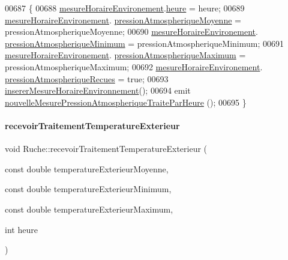 \begin{DoxyCode}
00687 \{
00688     \hyperlink{class_ruche_a73a826506110c10d9221065670985e52}{mesureHoraireEnvironement}.\hyperlink{struct_mesure_horaire_environement_a83295c95940d9edae2d082a94f49e1c9}{heure} = heure;
00689     \hyperlink{class_ruche_a73a826506110c10d9221065670985e52}{mesureHoraireEnvironement}.
      \hyperlink{struct_mesure_horaire_environement_a6ae12cb9b6ac6a46f7c08e60049c7b72}{pressionAtmospheriqueMoyenne} = pressionAtmospheriqueMoyenne;
00690     \hyperlink{class_ruche_a73a826506110c10d9221065670985e52}{mesureHoraireEnvironement}.
      \hyperlink{struct_mesure_horaire_environement_a3d42b48772717461f7395cdae5ff925f}{pressionAtmospheriqueMinimum} = pressionAtmospheriqueMinimum;
00691     \hyperlink{class_ruche_a73a826506110c10d9221065670985e52}{mesureHoraireEnvironement}.
      \hyperlink{struct_mesure_horaire_environement_a9b82da49ea52c6f118f25433a16e22d4}{pressionAtmospheriqueMaximum} = pressionAtmospheriqueMaximum;
00692     \hyperlink{class_ruche_a73a826506110c10d9221065670985e52}{mesureHoraireEnvironement}.
      \hyperlink{struct_mesure_horaire_environement_a5db5e56af7d297b500912489126f7305}{pressionAtmospheriqueRecues} = \textcolor{keyword}{true};
00693     \hyperlink{class_ruche_ac52e79446c5629645e02e27d2a01e56c}{insererMesureHoraireEnvironnement}();
00694     emit \hyperlink{class_ruche_a7948d81996c196eeb0f20dc203a52e75}{nouvelleMesurePressionAtmospheriqueTraiteParHeure}
      ();
00695 \}
\end{DoxyCode}
\mbox{\label{class_ruche_a8482dda95a8a7888d5a60ea6f7d8729e}} 
\paragraph{\texorpdfstring{recevoir\+Traitement\+Temperature\+Exterieur}{recevoirTraitementTemperatureExterieur}}
{\footnotesize\ttfamily void Ruche\+::recevoir\+Traitement\+Temperature\+Exterieur (\begin{DoxyParamCaption}\item[{const double}]{temperature\+Exterieur\+Moyenne,  }\item[{const double}]{temperature\+Exterieur\+Minimum,  }\item[{const double}]{temperature\+Exterieur\+Maximum,  }\item[{int}]{heure }\end{DoxyParamCaption})\hspace{0.3cm}{\ttfamily [slot]}}



